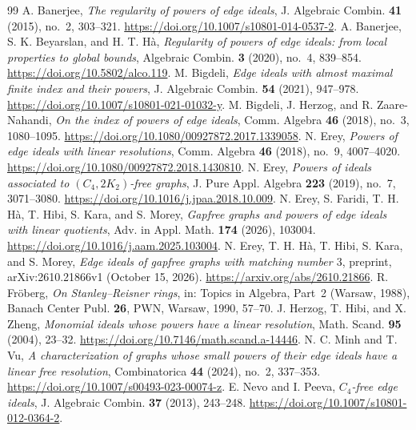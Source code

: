 \documentclass[11pt,a4paper]{article}
\theoremstyle{remark}\newtheorem{remark}[theorem]{Remark}
\begin{document}
\begin{thebibliography}{99}\small
{} A. Banerjee, \emph{The regularity of powers of edge ideals}, J. Algebraic Combin. \textbf{41} (2015), no.~2, 303--321. \url{https://doi.org/10.1007/s10801-014-0537-2}.
 A. Banerjee, S. K. Beyarslan, and H. T. H\`a, \emph{Regularity of powers of edge ideals: from local properties to global bounds}, Algebraic Combin. \textbf{3} (2020), no.~4, 839--854. \url{https://doi.org/10.5802/alco.119}.
 M. Bigdeli, \emph{Edge ideals with almost maximal finite index and their powers}, J. Algebraic Combin. \textbf{54} (2021), 947--978. \url{https://doi.org/10.1007/s10801-021-01032-y}.
 M. Bigdeli, J. Herzog, and R. Zaare-Nahandi, \emph{On the index of powers of edge ideals}, Comm. Algebra \textbf{46} (2018), no.~3, 1080--1095. \url{https://doi.org/10.1080/00927872.2017.1339058}.
 N. Erey, \emph{Powers of edge ideals with linear resolutions}, Comm. Algebra \textbf{46} (2018), no.~9, 4007--4020. \url{https://doi.org/10.1080/00927872.2018.1430810}.
 N. Erey, \emph{Powers of ideals associated to $(C_4,2K_2)$-free graphs}, J. Pure Appl. Algebra \textbf{223} (2019), no.~7, 3071--3080. \url{https://doi.org/10.1016/j.jpaa.2018.10.009}.
 N. Erey, S. Faridi, T. H. H\`a, T. Hibi, S. Kara, and S. Morey, \emph{Gapfree graphs and powers of edge ideals with linear quotients}, Adv. in Appl. Math. \textbf{174} (2026), 103004. \url{https://doi.org/10.1016/j.aam.2025.103004}.
 N. Erey, T. H. H\`a, T. Hibi, S. Kara, and S. Morey, \emph{Edge ideals of gapfree graphs with matching number $3$}, preprint, arXiv:2610.21866v1 (October 15, 2026). \url{https://arxiv.org/abs/2610.21866}.
 R. Fr\"oberg, \emph{On Stanley--Reisner rings}, in: Topics in Algebra, Part~2 (Warsaw, 1988), Banach Center Publ. \textbf{26}, PWN, Warsaw, 1990, 57--70.
 J. Herzog, T. Hibi, and X. Zheng, \emph{Monomial ideals whose powers have a linear resolution}, Math. Scand. \textbf{95} (2004), 23--32. \url{https://doi.org/10.7146/math.scand.a-14446}.
 N. C. Minh and T. Vu, \emph{A characterization of graphs whose small powers of their edge ideals have a linear free resolution}, Combinatorica \textbf{44} (2024), no.~2, 337--353. \url{https://doi.org/10.1007/s00493-023-00074-z}.
 E. Nevo and I. Peeva, \emph{$C_4$-free edge ideals}, J. Algebraic Combin. \textbf{37} (2013), 243--248. \url{https://doi.org/10.1007/s10801-012-0364-2}.
\end{thebibliography}
\end{document}
